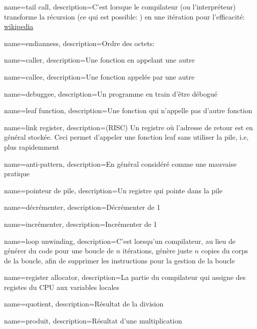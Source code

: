 {
  name={tail call},
  description={C'est lorsque le compilateur (ou l'interpréteur) transforme la récursion (ce qui est possible: )
  en une itération pour l'efficacité: \href{http://go.yurichev.com/17105}{wikipedia}}
}

{
  name=endianness,
  description={Ordre des octets: }
}

{
  name=caller,
  description={Une fonction en appelant une autre}
}

{
  name=callee,
  description={Une fonction appelée par une autre}
}

{
  name=debuggee,
  description={Un programme en train d'être débogué}
}

{
  name=leaf function,
  description={Une fonction qui n'appelle pas d'autre fonction}
}

{
  name=link register,
  description={(RISC) Un registre où l'adresse de retour est en général stockée. Ceci permet
  d'appeler une fonction leaf sans utiliser la pile, i.e, plus rapidemment}
}

{
  name=anti-pattern,
  description={En général considéré comme une mauvaise pratique}
}

{
  name=pointeur de pile,
  description={Un registre qui pointe dans la pile}
}

{
  name=décrémenter,
  description={Décrémenter de 1}
}

{
  name=incrémenter,
  description={Incrémenter de 1}
}

{
  name=loop unwinding,
  description={C'est lorsqu'un compilateur, au lieu de générer du code pour une boucle de
  $n$ itérations, génère juste $n$ copies du corps de la boucle, afin de supprimer
  les instructions pour la gestion de la boucle}
}

{
  name=register allocator,
  description={La partie du compilateur qui assigne des registes du CPU aux variables locales}
}

{
  name=quotient,
  description={Résultat de la division}
}

{
  name=produit,
  description={Résultat d'une multiplication}
}

